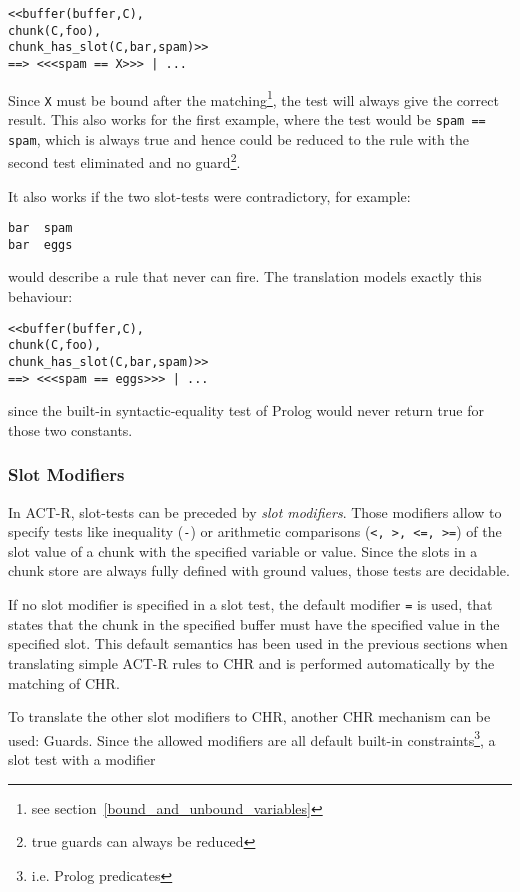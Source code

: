 \begin{lstlisting}
<<buffer(buffer,C),
chunk(C,foo),
chunk_has_slot(C,bar,spam)>>
==> <<<spam == X>>> | ...
\end{lstlisting}

Since \verb|X| must be bound after the matching\footnote{see section~\ref{bound_and_unbound_variables}}, the test will always give the correct result. This also works for the first example, where the test would be \verb|spam == spam|, which is always true and hence could be reduced to the rule with the second test eliminated and no guard\footnote{true guards can always be reduced}.

It also works if the two slot-tests were contradictory, for example: 

\begin{lstlisting}
bar  spam
bar  eggs
\end{lstlisting}

would describe a rule that never can fire. The translation models exactly this behaviour:

\begin{lstlisting}
<<buffer(buffer,C),
chunk(C,foo),
chunk_has_slot(C,bar,spam)>>
==> <<<spam == eggs>>> | ...
\end{lstlisting}

since the built-in syntactic-equality test of Prolog would never return true for those two constants.

\subsubsection{Slot Modifiers}
\label{slot_modifiers}

In ACT-R, slot-tests can be preceded by \emph{slot modifiers}. Those modifiers allow to specify tests like inequality (\verb|-|) or arithmetic comparisons (\verb|<, >, <=, >=|) of the slot value of a chunk with the specified variable or value. Since the slots in a chunk store are always fully defined with ground values, those tests are decidable.

If no slot modifier is specified in a slot test, the default modifier \verb|=| is used, that states that the chunk in the specified buffer must have the specified value in the specified slot. This default semantics has been used in the previous sections when translating simple ACT-R rules to CHR and is performed automatically by the matching of CHR.

To translate the other slot modifiers to CHR, another CHR mechanism can be used: Guards. Since the allowed modifiers are all default built-in constraints\footnote{i.e. Prolog predicates}, a slot test with a modifier

